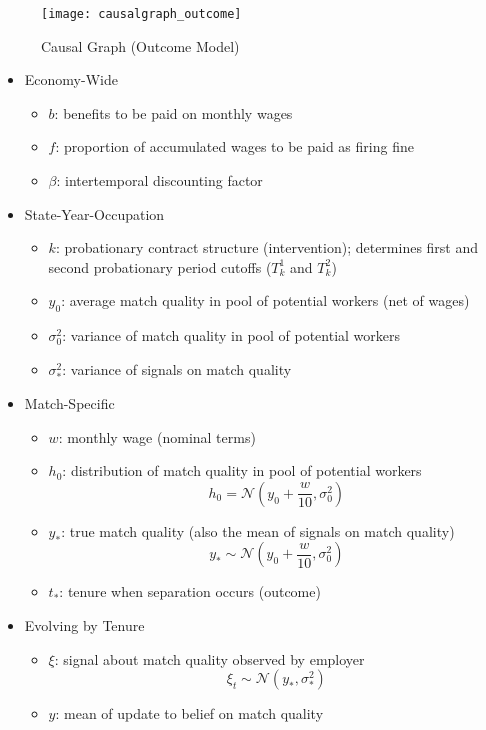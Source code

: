\documentclass[12pt]{article}
\begin{document}
\newpage

\begin{figure}[h!]
  \centering
  \texttt{[image: causalgraph\_outcome]}
  \caption{Causal Graph (Outcome Model)}
  \label{fig:causalgraph_outcome}
\end{figure}

\begin{itemize}
\item Economy-Wide
\begin{itemize}
\item $b$: benefits to be paid on monthly wages
\item $f$: proportion of accumulated wages to be paid as firing fine
\item $\beta$: intertemporal discounting factor
\end{itemize}
\item State-Year-Occupation
\begin{itemize}
\item $k$: probationary contract structure (intervention); determines first and second probationary period cutoffs ($T_k^1$ and $T_k^2$)
\item $y_0$: average match quality in pool of potential workers (net of wages)
\item $\sigma^2_0$: variance of match quality in pool of potential workers
\item $\sigma^2_*$: variance of signals on match quality
\end{itemize}
\item Match-Specific
\begin{itemize}
\item $w$: monthly wage (nominal terms)
\item $h_0$: distribution of match quality in pool of potential workers
$$h_0=\mathcal{N}\left(y_0+\frac{w}{10},\sigma^2_0\right)$$
\item $y_*$: true match quality (also the mean of signals on match quality)
$$y_*\sim \mathcal{N}\left(y_0+\frac{w}{10},\sigma^2_0\right)$$
\item $t_*$: tenure when separation occurs (outcome)
\end{itemize}
\item Evolving by Tenure
\begin{itemize}
\item $\xi$: signal about match quality observed by employer
$$\xi_t\sim\mathcal{N}\left(y_*,\sigma^2_*\right)$$
\item $y$: mean of update to belief on match quality

\end{itemize}
\end{itemize}
\end{document}
